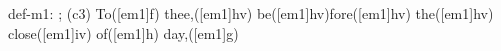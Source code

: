 def-m1: \grealign;
(c3) To([em1]f) thee,([em1]hv) be([em1]hv)fore([em1]hv) the([em1]hv) close([em1]iv) of([em1]h) day,([em1]g)